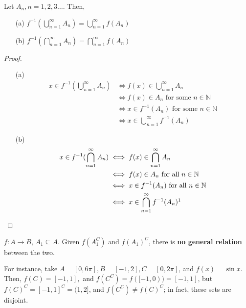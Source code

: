 \documentclass[12pt]{article}
\begin{document}
\begin{proposition}
  Let $A_n, n = 1,2,3 \dots$. Then, 
  \begin{itemize}
    \item[(a)] $f^{-1}(\bigcup_{n=1}^{\infty}A_n) = \bigcup_{n=1}^{\infty}f(A_n)$
    \item[(b)] $f^{-1}(\bigcap_{n=1}^{\infty}A_n) = \bigcap_{n=1}^{\infty}f(A_n)$
  \end{itemize}
\end{proposition}

\begin{proof}\footnotemark
  \begin{itemize}
    \item[(a)]
  \begin{align*}
    x \in f^{-1}(\bigcup_{n=1}^{\infty}A_n) &\iff f(x) \in \bigcup_{n=1}^\infty A_n\\
    & \iff f(x) \in A_n \text{ for some } n \in \mathbb{N}\\
    & \iff x \in f^{-1}(A_n) \text{ for some } n \in \mathbb{N}\\
    & \iff x \in \bigcup_{n=1}^\infty f^{-1}(A_n)
  \end{align*}
  \item[(b)]
  \begin{align*}
    x \in f^{-1}(\bigcap_{n=1}^{\infty}A_n) &\iff f(x) \in \bigcap_{n=1}^\infty A_n\\
    &\iff f(x) \in A_n \text{ for all } n \in \mathbb{N}\\
    &\iff x \in f^{-1}(A_n) \text{ for all } n \in \mathbb{N}\\
    &\iff x \in \bigcap_{n=1}^\infty f^{-1}(A_n)\footnotemark
  \end{align*}
  \end{itemize}
\end{proof}

\begin{remark}
  $f: A \to B$, $A_1 \subseteq A$. Given $f(A_1^C)$ and $f(A_1)^C$, there is \textbf{no general relation} between the two.

  For instance, take $A = [0, 6 \pi], B = [-1, 2], C = [0, 2 \pi]$, and $f(x) = \sin x$. Then, $f(C) = [-1,1],$ and $f(C^C) = f([-1,0)) = [-1,1]$, but $f(C)^C = [-1,1]^C = (1,2]$, and $f(C^C) \neq f(C)^C$; in fact, these sets are disjoint.
\end{remark}
\end{document}
